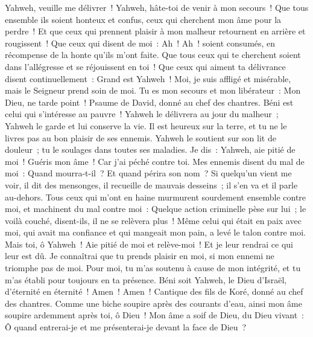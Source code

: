 \begin{multicols}{2}
Yahweh, veuille me délivrer~! Yahweh, hâte-toi de venir à mon secours~!
Que tous ensemble ils soient honteux et confus, ceux qui cherchent mon âme pour la perdre~! Et que ceux qui prennent plaisir à mon malheur retournent en arrière et rougissent~!
Que ceux qui disent de moi~: Ah~! Ah~! soient consumés, en récompense de la honte qu'ils m'ont faite.
Que tous ceux qui te cherchent soient dans l'allégresse et se réjouissent en toi~! Que ceux qui aiment ta délivrance disent continuellement~: Grand est Yahweh~!
Moi, je suis affligé et misérable, mais le Seigneur prend soin de moi. Tu es mon secours et mon libérateur~: Mon Dieu, ne tarde point~!
\VerseOne{}Psaume de David, donné au chef des chantres.
Béni est celui qui s'intéresse au pauvre~! Yahweh le délivrera au jour du malheur~;
Yahweh le garde et lui conserve la vie. Il est heureux sur la terre, et tu ne le livres pas au bon plaisir de ses ennemis.
Yahweh le soutient sur son lit de douleur~; tu le soulages dans toutes ses maladies.
Je dis~: Yahweh, aie pitié de moi~! Guéris mon âme~! Car j'ai péché contre toi.
Mes ennemis disent du mal de moi~: Quand mourra-t-il~? Et quand périra son nom~?
Si quelqu'un vient me voir, il dit des mensonges, il recueille de mauvais desseins~; il s'en va et il parle au-dehors.
Tous ceux qui m'ont en haine murmurent sourdement ensemble contre moi, et machinent du mal contre moi~:
Quelque action criminelle pèse sur lui~; le voilà couché, disent-ils, il ne se relèvera plus~!
Même celui qui était en paix avec moi, qui avait ma confiance et qui mangeait mon pain, a levé le talon contre moi.
Mais toi, ô Yahweh~! Aie pitié de moi et relève-moi~! Et je leur rendrai ce qui leur est dû.
Je connaîtrai que tu prends plaisir en moi, si mon ennemi ne triomphe pas de moi.
Pour moi, tu m'as soutenu à cause de mon intégrité, et tu m'as établi pour toujours en ta présence.
Béni soit Yahweh, le Dieu d'Israël, d'éternité en éternité~! Amen~! Amen~!
\VerseOne{}Cantique des fils de Koré, donné au chef des chantres.
Comme une biche soupire après des courants d'eau, ainsi mon âme soupire ardemment après toi, ô Dieu~!
Mon âme a soif de Dieu, du Dieu vivant~: Ô quand entrerai-je et me présenterai-je devant la face de Dieu~?

\end{multicols}

